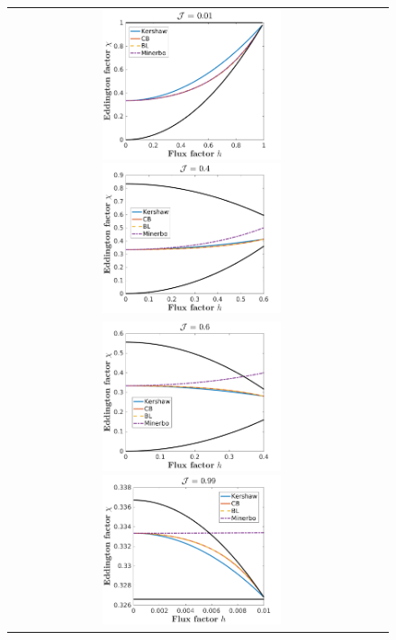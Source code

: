 \begin{figure}[h]
  \centering
  \begin{tabular}{cc}
    \includegraphics[width=0.5\textwidth]{figures/Closures0_01}
    \includegraphics[width=0.5\textwidth]{figures/Closures0_40} \\
    \includegraphics[width=0.5\textwidth]{figures/Closures0_60}
    \includegraphics[width=0.5\textwidth]{figures/Closures0_99}

\end{tabular}
\end{figure}
